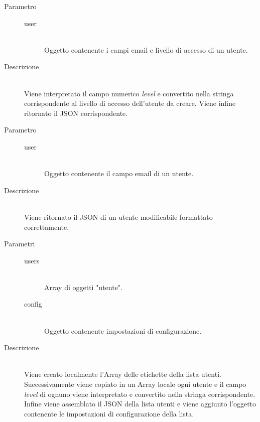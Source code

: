 \begin{description}
\begin{mldescription}
    \hfill
   \begin{description}
    \item[Parametro] \hfill
     \begin{description}
      \item[user] \hfill \\
      Oggetto contenente i campi email e livello di accesso di un utente.
     \end{description}
    \item[Descrizione] \hfill \\
    Viene interpretato il campo numerico \textit{level} e convertito nella stringa corrispondente al livello di accesso dell'utente da creare. Viene infine ritornato il JSON corrispondente.
   \end{description}
   
    \hfill
   \begin{description}
    \item[Parametro] \hfill
     \begin{description}
      \item[user] \hfill \\
      Oggetto contenente il campo email di un utente.
     \end{description}
    \item[Descrizione] \hfill \\
    Viene ritornato il JSON di un utente modificabile formattato correttamente.
   \end{description}
   
    \hfill
   \begin{description}
    \item[Parametri]
     \begin{description}
      \item[users] \hfill \\
      Array di oggetti "utente".
      \item[config] \hfill \\
      Oggetto contenente impostazioni di configurazione.
     \end{description}
    \item[Descrizione] \hfill \\
    Viene creato localmente l'Array delle etichette della lista utenti. Successivamente viene copiato in un Array locale ogni utente e il campo \textit{level} di ognuno viene interpretato e convertito nella stringa corrispondente. Infine viene assemblato il JSON della lista utenti e viene aggiunto l'oggetto contenente le impostazioni di configurazione della lista.
   \end{description}
   

\end{mldescription}
\end{description}
